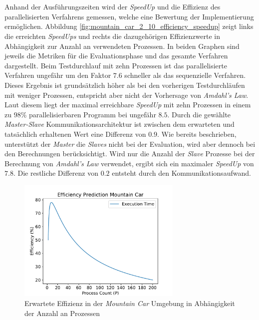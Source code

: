 \\\\
Anhand der Ausführungszeiten wird der \emph{SpeedUp} und die Effizienz des parallelisierten Verfahrens gemessen, welche eine Bewertung der Implementierung ermöglichen. Abbildung \ref{fig:mountain_car_2_10_efficiency_speedup} zeigt links die erreichten \emph{SpeedUps} und rechts die dazugehörigen Effizienzwerte in Abhängigkeit zur Anzahl an verwendeten Prozessen. In beiden Graphen sind jeweils die Metriken für die Evaluationsphase und das gesamte Verfahren dargestellt. Beim Testdurchlauf mit zehn Prozessen ist das parallelisierte Verfahren ungefähr um den Faktor $7.6$ schneller als das sequenzielle Verfahren. Dieses Ergebnis ist grundsätzlich höher als bei den vorherigen Testdurchläufen mit weniger Prozessen, entspricht aber nicht der Vorhersage von \emph{Amdahl's Law}. Laut diesem liegt der maximal erreichbare \emph{SpeedUp} mit zehn Prozessen in einem zu $98\%$ parallelisierbaren Programm bei ungefähr $8.5$. Durch die gewählte \emph{Master-Slave} Kommunikationsarchitektur ist zwischen dem erwarteten und tatsächlich erhaltenen Wert eine Differenz von $0.9$. Wie bereits beschrieben, unterstützt der \emph{Master} die \emph{Slaves} nicht bei der Evaluation, wird aber dennoch bei den Berechnungen berücksichtigt. Wird nur die Anzahl der \emph{Slave} Prozesse bei der Berechnung von \emph{Amdahl's Law} verwendet, ergibt sich ein maximaler \emph{SpeedUp} von $7.8$. Die restliche Differenz von $0.2$ entsteht durch den Kommunikationsaufwand. 
\begin{figure}[!h]
	\centering
	\includegraphics[width=0.7\textwidth]{./img/mountain_car_analysis/mountain_car_efficiency_prediction.pdf} 
	\caption{Erwartete Effizienz in der \emph{Mountain Car} Umgebung in Abhängigkeit der Anzahl an Prozessen}
	\label{fig:mountain_car_efficiency_predidction}
\end{figure}
